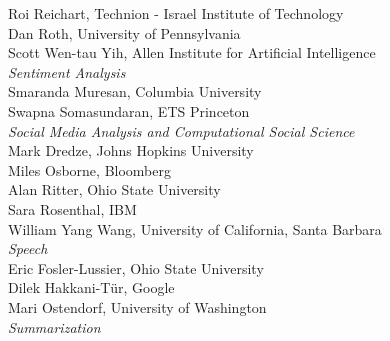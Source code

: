                                     \hspace*{0.2in} Roi Reichart, Technion - Israel Institute of Technology \\
                                    \hspace*{0.2in} Dan Roth, University of Pennsylvania \\
                                    \hspace*{0.2in} Scott Wen-tau Yih, Allen Institute for Artificial Intelligence \\
                            \emph{Sentiment Analysis} \\
                                    \hspace*{0.2in} Smaranda Muresan, Columbia University \\
                                    \hspace*{0.2in} Swapna Somasundaran, ETS Princeton \\
                            \emph{Social Media Analysis and Computational Social Science} \\
                                    \hspace*{0.2in} Mark Dredze, Johns Hopkins University \\
                                    \hspace*{0.2in} Miles Osborne, Bloomberg \\
                                    \hspace*{0.2in} Alan Ritter, Ohio State University \\
                                    \hspace*{0.2in} Sara Rosenthal, IBM \\
                                    \hspace*{0.2in} William Yang Wang, University of California, Santa Barbara \\
                            \emph{Speech} \\
                                    \hspace*{0.2in} Eric Fosler-Lussier, Ohio State University \\
                                    \hspace*{0.2in} Dilek Hakkani-Tür, Google \\
                                    \hspace*{0.2in} Mari Ostendorf, University of Washington \\
                            \emph{Summarization} \\
